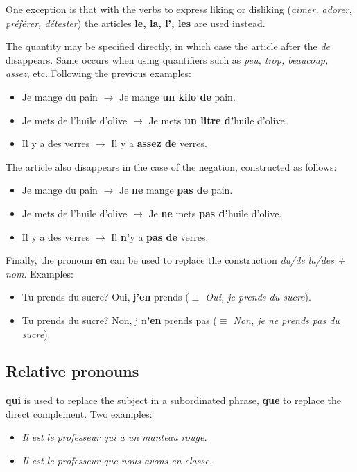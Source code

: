 \documentclass[palatino]{nicenotes}
\begin{document}
One exception is that with the verbs to express liking or disliking (\textit{aimer, adorer, préférer, détester}) the articles \textbf{le, la, l', les} are used instead.

The quantity may be specified directly, in which case the article after the \textit{de} disappears. Same occurs when using quantifiers such as \textit{peu, trop, beaucoup, assez}, etc. Following the previous examples:

\begin{itemize}
\item Je mange du pain $\to$ Je mange \textbf{un kilo de} pain.
\item Je mets de l'huile d'olive $\to$ Je mets \textbf{un litre d'}huile d'olive.
\item Il y a des verres $\to$ Il y a \textbf{assez de} verres.
\end{itemize}

The article also disappears in the case of the negation, constructed as follows:

\begin{itemize}
\item Je mange du pain $\to$ Je \textbf{ne} mange \textbf{pas de} pain.
\item Je mets de l'huile d'olive $\to$ Je \textbf{ne} mets \textbf{pas d'}huile d'olive.
\item Il y a des verres $\to$ Il \textbf{n'}y a \textbf{pas de} verres.
\end{itemize}

Finally, the pronoun \textbf{en} can be used to replace the construction \textit{du/de la/des + nom}. Examples:

\begin{itemize}
\item Tu prends du sucre? Oui, j\textbf{'en} prends (\textit{$\equiv$ Oui, je prends du sucre}).
\item Tu prends du sucre? Non, j n\textbf{'en} prends pas (\textit{$\equiv$ Non, je ne prends pas du sucre}).
\end{itemize}

\subsection{Relative pronouns}

\textbf{qui} is used to replace the subject in a subordinated phrase, \textbf{que} to replace the direct complement. Two examples:

\begin{itemize}
\item \textit{Il est le professeur qui a un manteau rouge.}
\item \textit{Il est le professeur que nous avons en classe.}
\end{itemize}
\end{document}
